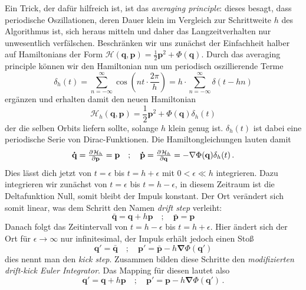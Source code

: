 \documentclass[12pt,a4paper,twoside]{article}
\renewcommand{\cite}{\citep}
\renewcommand{\vec}{\mathbf}
\renewcommand{\H}{\mathcal H}
\begin{document}
Ein Trick, der dafür hilfreich ist, ist das \textit{averaging principle}: dieses besagt, dass periodische Oszillationen, deren Dauer klein im Vergleich zur Schrittweite $h$ des Algorithmus ist, sich heraus mitteln und daher das Langzeitverhalten nur unwesentlich verfälschen\cite{Wisdom1991}.
Beschränken wir uns zunächst der Einfachheit halber auf Hamiltonians der Form $\mathcal H(\vec q,\vec p)= \frac{1}{2}\vec p^2+\Phi(\vec q)$. %
Durch das averaging principle können wir den Hamiltonian nun um periodisch oszillierende Terme
\begin{equation}
\delta_h(t) = \sum\limits_{n=-\infty}^{\infty} \cos(nt\cdot \frac{2\pi}{h}) = h \cdot \sum\limits_{n=-\infty}^{\infty} \delta(t-h n)
\end{equation} %
ergänzen und erhalten damit den neuen Hamiltonian
\begin{equation}
\mathcal H_h(\vec q,\vec p)= \frac{1}{2}\vec p^2+\Phi(\vec q)\delta_h(t)
\end{equation}
der die selben Orbits liefern sollte, solange $h$ klein genug ist. $\delta_h(t)$ ist dabei eine periodische Serie von Dirac-Funktionen. Die Hamiltongleichungen lauten damit
\begin{equation}
\vec{\dot q} = \pd{\H_h}{\vec{p}} = \vec{p} \quad ; \quad 
\vec{\dot p} = \pd{\H_h}{\vec{q}} = - \vec{\nabla}\Phi(\vec q)\delta_h(t) \, .
\end{equation}
Dies lässt dich jetzt von $t=\epsilon$ bis $t=h+\epsilon$ mit $0 < \epsilon \ll h$ integrieren. Dazu integrieren wir zunächst von $t=\epsilon$ bis $t=h-\epsilon$, in diesem Zeitraum ist die Deltafunktion Null, somit bleibt der Impuls konstant. Der Ort verändert sich somit linear, was dem Schritt den Namen \textit{drift step} verleiht:
\begin{equation}
\bar{\vec{q}} = \vec{q}+h\vec{p} \quad ; \quad \bar{\vec{p}} = \vec{p}
\end{equation}
Danach folgt das Zeitintervall von $t=h-\epsilon$ bis $t=h+\epsilon$. Hier ändert sich der Ort für $\epsilon\to\infty$ nur infinitesimal, der Impuls erhält jedoch einen Stoß
\begin{equation}
\vec{q'}=\vec{\bar{q}} \quad ; \quad \vec{p'}=\vec{\bar{p}}-h\vec{\nabla}\Phi(\vec{q'})
\end{equation}
dies nennt man den \textit{kick step}. Zusammen bilden diese Schritte den \textit{modifizierten drift-kick Euler Integrator}\cite{Binney2008}.
Das Mapping für diesen lautet also
\begin{equation}
\vec{q'}=\vec{q}+h\vec{p} \quad ; \quad \vec{p'}=\vec{p}-h\vec{\nabla}\Phi(\vec{q'})\,.
\end{equation}
\end{document}
